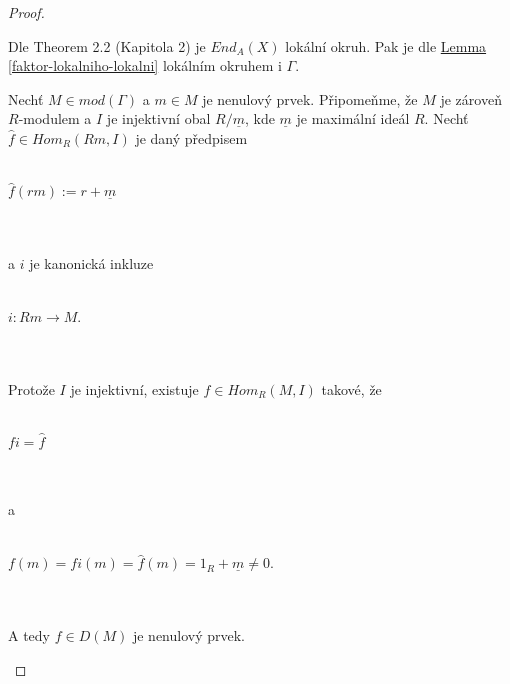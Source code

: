      \begin{proof}
       \begin{description}
         \item
         \item[(a)] Dle \cite{2} Theorem 2.2 (Kapitola 2) je $End_A(X)$ 
           lokální okruh. Pak je dle \hyperref[faktor-lokalniho-lokalni]{Lemma \ref*{faktor-lokalniho-lokalni}}
           lokálním okruhem i $\Gamma$. 
           
         \item[(b)] Nechť $M\in mod(\Gamma)$ a $m\in M$ je nenulový prvek. 
           Připomeňme, že $M$ je zároveň $R$-modulem a $I$ je injektivní obal $R/\underline{m}$, 
           kde $\underline{m}$ je maximální ideál $R$. Nechť $\hat f\in Hom_R(Rm,I)$ 
           je daný předpisem \\\\
           \centerline{$\hat f (rm):=r+\underline m$} \\\\
           a $i$ je kanonická inkluze \\\\
           \centerline{$i:Rm\rightarrow M$.} \\\\
           Protože $I$ je injektivní, existuje $f\in Hom_R(M,I)$  takové, že 
           \\\\
           \centerline{$fi=\hat f$} \\\\
           a \\\\
           \centerline{$f(m)=fi(m)=\hat f (m)=1_R+ \underline m\neq 0$.} \\\\
           A tedy $f\in D(M)$ je nenulový prvek.           
         

\end{description}
\end{proof}
